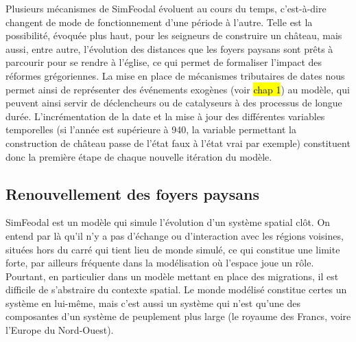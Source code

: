 \begin{tcolorbox}[breakable,left=0pt,right=0pt,top=0pt,bottom=0pt,
	colback=gray!15,colframe=gray!15,width=\dimexpr\textwidth\relax, 
	enlarge left by=0mm, boxsep=5pt,arc=0pt,outer arc=0pt]
Plusieurs mécanismes de SimFeodal évoluent au cours du temps, c'est-à-dire changent de mode de fonctionnement d'une période à l'autre.
Telle est la possibilité, évoquée plus haut, pour les seigneurs de construire un château, mais aussi, entre autre, l'évolution des distances que les foyers paysans sont prêts à parcourir pour se rendre à l'église, ce qui permet de formaliser l'impact des réformes grégoriennes.
La mise en place de mécanismes tributaires de dates nous permet ainsi de représenter des événements exogènes (voir \hl{chap 1}) au modèle, qui peuvent ainsi servir de déclencheurs ou de catalyseurs à des processus de longue durée.
L'incrémentation de la date et la mise à jour des différentes variables temporelles (si l'année est supérieure à 940, la variable permettant la construction de château passe de l'état faux à l'état vrai par exemple) constituent donc la première étape de chaque nouvelle itération du modèle.
\end{tcolorbox}

\subsection{Renouvellement des foyers paysans \label{meca-renouvellement}}

SimFeodal est un modèle qui simule l'évolution d'un système spatial clôt.
On entend par là qu'il n'y a pas d'échange ou d'interaction avec les régions voisines, situées hors du carré qui tient lieu de monde simulé, ce qui constitue une limite forte, par ailleurs fréquente dans la modélisation où l'espace joue un rôle.
Pourtant, en particulier dans un modèle mettant en place des migrations, il est difficile de s'abstraire du contexte spatial.
Le monde modélisé constitue certes un système en lui-même, mais c'est aussi un système qui n'est qu'une des composantes d'un système de peuplement plus large (le royaume des Francs, voire l'Europe du Nord-Ouest).

